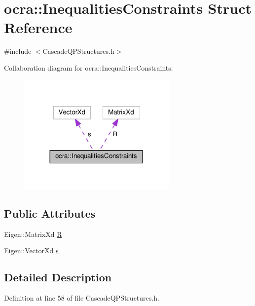\hypertarget{structocra_1_1InequalitiesConstraints}{}\section{ocra\+:\+:Inequalities\+Constraints Struct Reference}
\label{structocra_1_1InequalitiesConstraints}


{\ttfamily \#include $<$Cascade\+Q\+P\+Structures.\+h$>$}



Collaboration diagram for ocra\+:\+:Inequalities\+Constraints\+:
\nopagebreak
\begin{figure}[H]
\begin{center}
\leavevmode
\includegraphics[width=221pt]{dd/de6/structocra_1_1InequalitiesConstraints__coll__graph}
\end{center}
\end{figure}
\subsection*{Public Attributes}
\begin{DoxyCompactItemize}
\item 
Eigen\+::\+Matrix\+Xd \hyperlink{structocra_1_1InequalitiesConstraints_a855a07da37932011602005e3af25aa76}{R}
\item 
Eigen\+::\+Vector\+Xd \hyperlink{structocra_1_1InequalitiesConstraints_a26db4bbe606a537c1dedbc30a2ca8f36}{s}
\end{DoxyCompactItemize}


\subsection{Detailed Description}


Definition at line 58 of file Cascade\+Q\+P\+Structures.\+h.



